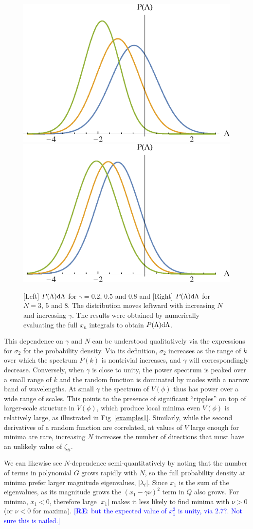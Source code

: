 \documentclass[12pt]{article}
\newcommand{\re}[1]{\textcolor{blue}{[{\bf RE}: #1]}}
\begin{document}
\begin{figure}
  \centering
  \includegraphics[width=0.45 \linewidth]{PLam_gamma.eps}  \hfill
  \includegraphics[width=0.45 \linewidth]{PLam_N.eps}
  \caption{[Left] $P(\Lambda){\rm d}\Lambda$ for $\gamma = 0.2$, $0.5$ and $0.8$ and [Right] $P(\Lambda){\rm d}\Lambda$ for $N=3$, $5$ and $8$. The distribution moves leftward with increasing $N$ and increasing $\gamma$. The results were obtained by numerically evaluating the full $x_n$ integrals to obtain $P(\Lambda){\rm d}\Lambda$.  }
  \label{distributions}
  \end{figure}

This dependence on $\gamma$ and $N$ can be understood qualitatively via the expressions for $\sigma_2$ for the probability density. Via its definition, $\sigma_2$ increases as the range of $k$ over which the spectrum $P(k)$  is nontrivial  increases, and $\gamma$ will correspondingly decrease. Conversely, when $\gamma$ is close to unity, the power spectrum is peaked over a small range of $k$ and the random function is dominated by modes with a narrow band of wavelengths.  At small $\gamma$ the spectrum of $V(\phi)$ thus has power over a wide range of scales. This points to the presence of significant ``ripples'' on top of  larger-scale structure in $V(\phi)$, which  produce local minima even $V(\phi)$ is relatively large,  as illustrated in Fig~\ref{examples1}.  Similarly, while the second derivatives of a random function are correlated, at values of $V$ large enough for minima are rare, increasing $N$  increases the number of directions that must have an unlikely value of $\zeta_{ii}$. 

We can likewise see $N$-dependence semi-quantitatively by noting that the number of terms in polynomial $G$ grows rapidly with $N$, so the full probability density at minima prefer larger magnitude eigenvalues, $|\lambda_i|$. Since $x_1$ is the sum of the eigenvalues, as its magnitude grows the $(x_1-\gamma \nu)^2$ term in $Q$ also grows. For minima, $x_1<0$, therefore large $|x_1|$ makes it less likely to find minima with $\nu >0$ (or $\nu <0 $ for maxima).  \re{but the expected value of $x_1^2$ is unity, via 2.7?. Not sure this is nailed.}
\end{document}
